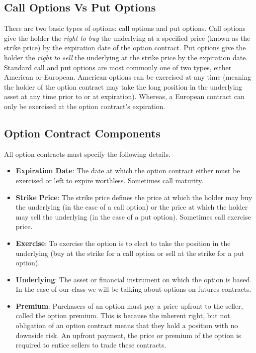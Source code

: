 \documentclass[
  letterpaper,
  DIV=11,
  numbers=noendperiod]{scrreprt}
\begin{document}
\hypertarget{call-options-vs-put-options}{%
\subsection{Call Options Vs Put
Options}\label{call-options-vs-put-options}}

There are two basic types of options: call options and put options. Call
options give the holder the \emph{right to buy} the underlying at a
specified price (known as the strike price) by the expiration date of
the option contract. Put options give the holder the \emph{right to
sell} the underlying at the strike price by the expiration date.
Standard call and put options are most commonly one of two types, either
American or European. American options can be exercised at any time
(meaning the holder of the option contract may take the long position in
the underlying asset at any time prior to or at expiration). Whereas, a
European contract can only be exercised at the option contract's
expiration.

\hypertarget{option-contract-components}{%
\subsection{Option Contract
Components}\label{option-contract-components}}

All option contracts must specify the following details.

\begin{itemize}
\item
  \textbf{Expiration Date}: The date at which the option contract either
  must be exercised or left to expire worthless. Sometimes call
  maturity.
\item
  \textbf{Strike Price}: The strike price defines the price at which the
  holder may buy the underlying (in the case of a call option) or the
  price at which the holder may sell the underlying (in the case of a
  put option). Sometimes call exercise price.
\item
  \textbf{Exercise}: To exercise the option is to elect to take the
  position in the underlying (buy at the strike for a call option or
  sell at the strike for a put option).
\item
  \textbf{Underlying}: The asset or financial instrument on which the
  option is based. In the case of our class we will be talking about
  options on futures contracts.
\item
  \textbf{Premium}: Purchasers of an option must pay a price upfront to
  the seller, called the option premium. This is because the inherent
  right, but not obligation of an option contract means that they hold a
  position with no downside risk. An upfront payment, the price or
  premium of the option is required to entice sellers to trade these
  contracts.
\end{itemize}
\end{document}
